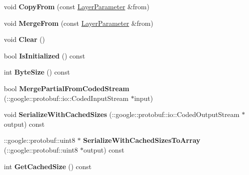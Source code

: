 \begin{DoxyCompactItemize}
void {\bfseries Copy\+From} (const \mbox{\hyperlink{classcaffe_1_1_layer_parameter}{Layer\+Parameter}} \&from)
\item 
\mbox{\label{classcaffe_1_1_layer_parameter_a726b2ba48f5e6e3d905038cf6ec970b6}} 
void {\bfseries Merge\+From} (const \mbox{\hyperlink{classcaffe_1_1_layer_parameter}{Layer\+Parameter}} \&from)
\item 
\mbox{\label{classcaffe_1_1_layer_parameter_a4d0ae6ff99b4dcc75a48344485c090b7}} 
void {\bfseries Clear} ()
\item 
\mbox{\label{classcaffe_1_1_layer_parameter_a2cf5f2ae6c6a0bec637ec5f9fdb18226}} 
bool {\bfseries Is\+Initialized} () const
\item 
\mbox{\label{classcaffe_1_1_layer_parameter_af5a3a50d881fce35e99cbdb6e8cb734d}} 
int {\bfseries Byte\+Size} () const
\item 
\mbox{\label{classcaffe_1_1_layer_parameter_a2e06af70b44accbb5483b213def6987c}} 
bool {\bfseries Merge\+Partial\+From\+Coded\+Stream} (\+::google\+::protobuf\+::io\+::\+Coded\+Input\+Stream $\ast$input)
\item 
\mbox{\label{classcaffe_1_1_layer_parameter_a549c8a6d44952cb4fe77db8a2192e8fa}} 
void {\bfseries Serialize\+With\+Cached\+Sizes} (\+::google\+::protobuf\+::io\+::\+Coded\+Output\+Stream $\ast$output) const
\item 
\mbox{\label{classcaffe_1_1_layer_parameter_ac33101b8ed8b88bf5fc5fa1d64740622}} 
\+::google\+::protobuf\+::uint8 $\ast$ {\bfseries Serialize\+With\+Cached\+Sizes\+To\+Array} (\+::google\+::protobuf\+::uint8 $\ast$output) const
\item 
\mbox{\label{classcaffe_1_1_layer_parameter_aa68dc098f50d9798f6c48c7582347df2}} 
int {\bfseries Get\+Cached\+Size} () const
\item 
\mbox{\label{classcaffe_1_1_layer_parameter_a5e70a52e6728efc42df3a7f05e407d6e}} 

\end{DoxyCompactItemize}
